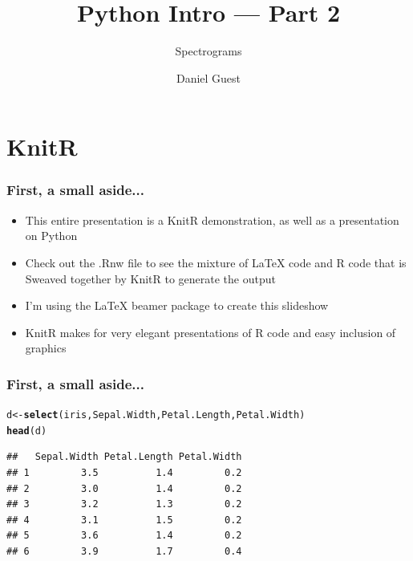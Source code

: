 \documentclass{beamer}\usepackage[]{graphicx}\usepackage[]{color}
\title{Python Intro --- Part 2}
\subtitle{Spectrograms}
\author{Daniel Guest}
\makeatletter
\newcommand{\hlstd}[1]{\textcolor[rgb]{0.345,0.345,0.345}{#1}}%
\newcommand{\hlkwb}[1]{\textcolor[rgb]{0.69,0.353,0.396}{#1}}%
\newcommand{\hlkwd}[1]{\textcolor[rgb]{0.737,0.353,0.396}{\textbf{#1}}}%
\newenvironment{kframe}{%
 \def\at@end@of@kframe{}%
 \ifinner\ifhmode%
  \def\at@end@of@kframe{\end{minipage}}%
  \begin{minipage}{\columnwidth}%
 \fi\fi%
 \def\FrameCommand##1{\hskip\@totalleftmargin \hskip-\fboxsep
 \colorbox{shadecolor}{##1}\hskip-\fboxsep
     \hskip-\linewidth \hskip-\@totalleftmargin \hskip\columnwidth}%
 \MakeFramed {\advance\hsize-\width
   \@totalleftmargin\z@ \linewidth\hsize
   \@setminipage}}%
 {\par\unskip\endMakeFramed%
 \at@end@of@kframe}
\newenvironment{knitrout}{}{} %
\makeatother
\begin{document}
\maketitle

\tableofcontents

\section{KnitR}

\begin{frame}[fragile]
\frametitle{First, a small aside...}
\begin{itemize}
	\item This entire presentation is a KnitR demonstration, as well as a presentation on Python

	\item Check out the .Rnw file to see the mixture of \LaTeX{} code and R code that is Sweaved together by KnitR to generate the output
	
	\item I'm using the \LaTeX{} beamer package to create this slideshow

	\item KnitR makes for very elegant presentations of R code and easy inclusion of graphics
\end{itemize}
\end{frame}

\begin{frame}[fragile]
\frametitle{First, a small aside...}


\begin{knitrout}
\color{fgcolor}\begin{kframe}
\begin{alltt}
\hlstd{d} \hlkwb{<-} \hlkwd{select}\hlstd{(iris, Sepal.Width, Petal.Length, Petal.Width)}
\hlkwd{head}\hlstd{(d)}
\end{alltt}
\begin{verbatim}
##   Sepal.Width Petal.Length Petal.Width
## 1         3.5          1.4         0.2
## 2         3.0          1.4         0.2
## 3         3.2          1.3         0.2
## 4         3.1          1.5         0.2
## 5         3.6          1.4         0.2
## 6         3.9          1.7         0.4
\end{verbatim}
\end{kframe}
\end{knitrout}
\end{frame}
\end{document}
